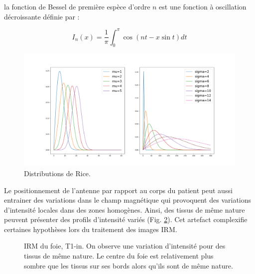 la fonction de Bessel de première espèce d'ordre $n$ est une fonction à oscillation décroissante définie par :

\begin{equation}
I_n(x) = \frac{1}{\pi}\int_0^{\pi} \cos(nt - x\sin t) dt
\end{equation}


\begin{figure}
    \centering
    \includegraphics[width=\textwidth]{Images/noise_CT_2.png}
    \caption{Distributions de Rice. }
    \label{fig:MRI_Rice}
\end{figure}

Le positionnement de l'antenne par rapport au corps du patient peut aussi entrainer des variations dans le champ magnétique qui provoquent des variations d'intensité locales dans des zones homogènes. Ainsi, des tissus de même nature peuvent présenter des profils d'intensité variés (Fig. \ref{fig:MRI_variations}). Cet artefact complexifie certaines hypothèses lors du traitement des images IRM.

\begin{figure}
    \centering
    \caption{IRM du foie, T1-in. On observe une variation d'intensité pour des tissus de même nature. Le centre du foie est relativement plus sombre que les tissus sur ses bords alors qu'ils sont de même nature.}
    \label{fig:MRI_variations}
\end{figure}

